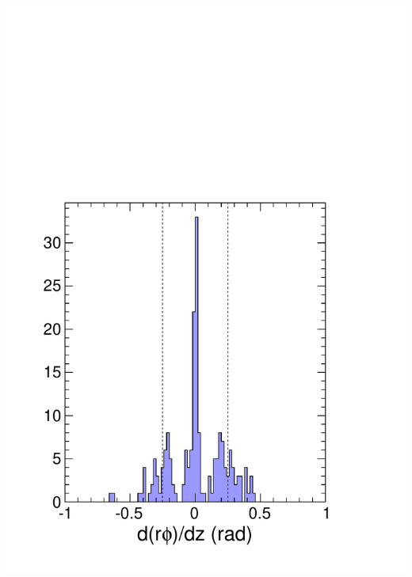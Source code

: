 \documentclass[compress]{beamer}
\begin{document}
\begin{frame}
\begin{columns}
\includegraphics[width=\linewidth]{REAL_beamline_pointing.pdf}


\end{columns}
\end{frame}
\end{document}
